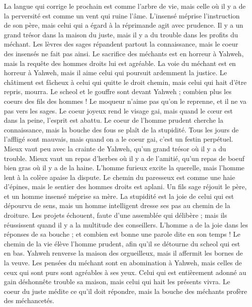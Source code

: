 \begin{multicols}{2}
La langue qui corrige le prochain est comme l'arbre de vie, mais celle où il y a de la perversité est comme un vent qui ruine l’âme.
L’insensé méprise l'instruction de son père, mais celui qui a égard à la réprimande agit avec prudence.
Il y a un grand trésor dans la maison du juste, mais il y a du trouble dans les profits du méchant.
Les lèvres des sages répandent partout la connaissance, mais le coeur des insensés ne fait pas ainsi.
Le sacrifice des méchants est en horreur à Yahweh, mais la requête des hommes droits lui est agréable.
La voie du méchant est en horreur à Yahweh, mais il aime celui qui poursuit ardemment la justice.
Le châtiment est fâcheux à celui qui quitte le droit chemin, mais celui qui hait d'être repris, mourra.
Le scheol et le gouffre sont devant Yahweh ; combien plus les coeurs des fils des hommes !
Le moqueur n'aime pas qu'on le reprenne, et il ne va pas vers les sages.
Le coeur joyeux rend le visage gai, mais quand le cœur est dans la peine, l'esprit est abattu.
Le coeur de l'homme prudent cherche la connaissance, mais la bouche des fous se plaît de la stupidité.
Tous les jours de l'affligé sont mauvais, mais quand on a le coeur gai, c'est un festin perpétuel.
Mieux vaut peu avec la crainte de Yahweh, qu'un grand trésor où il y a du trouble.
Mieux vaut un repas d'herbes où il y a de l'amitié, qu'un repas de boeuf bien gras où il y a de la haine.
L'homme furieux excite la querelle, mais l'homme lent à la colère apaise la dispute.
Le chemin du paresseux est comme une haie d’épines, mais le sentier des hommes droits est aplani.
Un fils sage réjouit le père, et un homme insensé méprise sa mère.
La stupidité est la joie de celui qui est dépourvu de sens, mais un homme intelligent dresse ses pas au chemin de la droiture.
Les projets échouent, faute d’une assemblée qui délibère ; mais ils réussissent quand il y a la multitude des conseillers.
L'homme a de la joie dans les réponses de sa bouche ; et combien est bonne une parole dite en son temps !
Le chemin de la vie élève l'homme prudent, afin qu'il se détourne du scheol qui est en bas.
Yahweh renverse la maison des orgueilleux, mais il affermit les bornes de la veuve.
Les pensées du méchant sont en abomination à Yahweh, mais celles de ceux qui sont purs sont agréables à ses yeux.
Celui qui est entièrement adonné au gain déshonnête trouble sa maison, mais celui qui hait les présents vivra.
Le coeur du juste médite ce qu'il doit répondre, mais la bouche des méchants profère des méchancetés.

\end{multicols}
